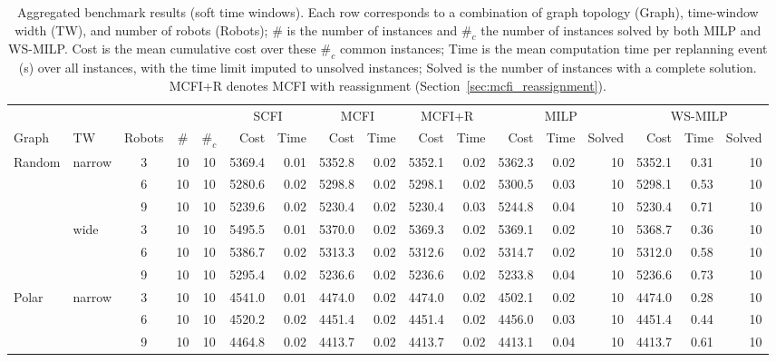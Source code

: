 {\color{red}
\begin{table}[tbp]
\caption{Aggregated benchmark results (soft time windows). Each row corresponds to a combination of graph topology (Graph), time-window width (TW), and number of robots (Robots); $\#$ is the number of instances and $\#_c$ the number of instances solved by both MILP and WS-MILP. Cost is the mean cumulative cost over these $\#_c$ common instances; Time is the mean computation time per replanning event (s) over all instances, with the time limit imputed to unsolved instances; Solved is the number of instances with a complete solution. MCFI+R denotes MCFI with reassignment (Section~\ref{sec:mcfi_reassignment}).}
\label{tab:all_results}
\resizebox{\textwidth}{!} {
\begin{tabular}{llccc|rr|rr|rr|rrr|rrr}
\toprule
 & & & & & \multicolumn{2}{c|}{SCFI} & \multicolumn{2}{c|}{MCFI} & \multicolumn{2}{c|}{MCFI+R} & \multicolumn{3}{c|}{MILP} & \multicolumn{3}{c}{WS-MILP} \\
Graph & TW & Robots & $\#$ & $\#_c$ & Cost & Time & Cost & Time & Cost & Time & Cost & Time & Solved & Cost & Time & Solved \\
\midrule
Random & narrow & 3 & 10 & 10 & 5369.4 & 0.01 & 5352.8 & 0.02 & 5352.1 & 0.02 & 5362.3 & 0.02 & 10 & 5352.1 & 0.31 & 10 \\
 &  & 6 & 10 & 10 & 5280.6 & 0.02 & 5298.8 & 0.02 & 5298.1 & 0.02 & 5300.5 & 0.03 & 10 & 5298.1 & 0.53 & 10 \\
 &  & 9 & 10 & 10 & 5239.6 & 0.02 & 5230.4 & 0.02 & 5230.4 & 0.03 & 5244.8 & 0.04 & 10 & 5230.4 & 0.71 & 10 \\ \cline{2-17}
 & wide & 3 & 10 & 10 & 5495.5 & 0.01 & 5370.0 & 0.02 & 5369.3 & 0.02 & 5369.1 & 0.02 & 10 & 5368.7 & 0.36 & 10 \\
 &  & 6 & 10 & 10 & 5386.7 & 0.02 & 5313.3 & 0.02 & 5312.6 & 0.02 & 5314.7 & 0.02 & 10 & 5312.0 & 0.58 & 10 \\
 &  & 9 & 10 & 10 & 5295.4 & 0.02 & 5236.6 & 0.02 & 5236.6 & 0.02 & 5233.8 & 0.04 & 10 & 5236.6 & 0.73 & 10 \\ \cline{1-17}
Polar & narrow & 3 & 10 & 10 & 4541.0 & 0.01 & 4474.0 & 0.02 & 4474.0 & 0.02 & 4502.1 & 0.02 & 10 & 4474.0 & 0.28 & 10 \\
 &  & 6 & 10 & 10 & 4520.2 & 0.02 & 4451.4 & 0.02 & 4451.4 & 0.02 & 4456.0 & 0.03 & 10 & 4451.4 & 0.44 & 10 \\
 &  & 9 & 10 & 10 & 4464.8 & 0.02 & 4413.7 & 0.02 & 4413.7 & 0.02 & 4413.1 & 0.04 & 10 & 4413.7 & 0.61 & 10 \\ \cline{2-17}

\end{tabular}}
\end{table}}
